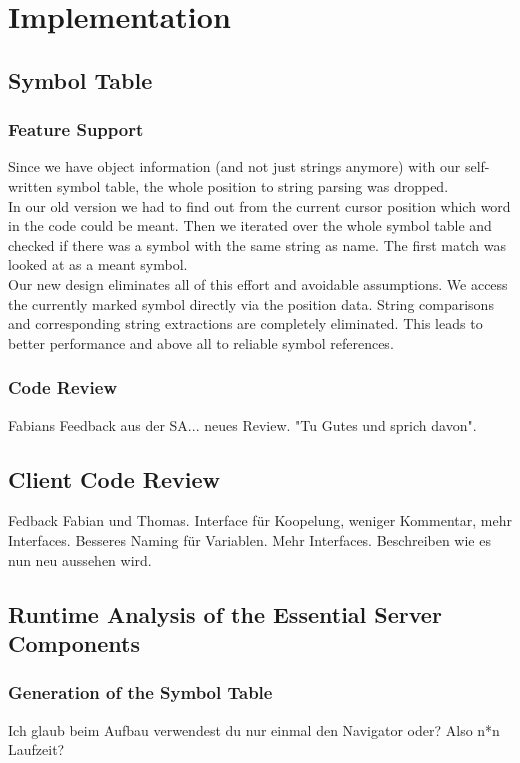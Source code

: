 \section{Implementation}

\subsection{Symbol Table}

\subsubsection{Feature Support}
Since we have object information (and not just strings anymore) with our self-written symbol table,
the whole position to string parsing was dropped. \\

In our old version we had to find out from the current cursor position which word in the code could be meant.
Then we iterated over the whole symbol table and checked if there was a symbol with the same string as name.
The first match was looked at as a meant symbol. \\

Our new design eliminates all of this effort and avoidable assumptions.
We access the currently marked symbol directly via the position data.
String comparisons and corresponding string extractions are completely eliminated.
This leads to better performance and above all to reliable symbol references.

\subsubsection{Code Review}
Fabians Feedback aus der SA... neues Review. "Tu Gutes und sprich davon".

\subsection{Client Code Review}
Fedback Fabian und Thomas. Interface für Koopelung, weniger Kommentar, mehr Interfaces. Besseres Naming für Variablen. Mehr Interfaces.
Beschreiben wie es nun neu aussehen wird.

\subsection{Runtime Analysis of the Essential Server Components}
\subsubsection{Generation of the Symbol Table}
Ich glaub beim Aufbau verwendest du nur einmal den Navigator oder? Also n*n Laufzeit?

